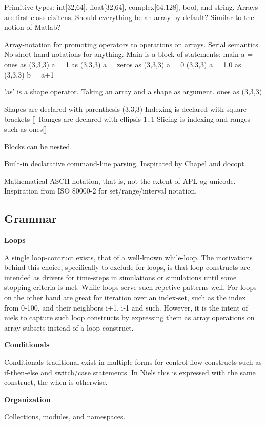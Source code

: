 \documentclass{sigplanconf}
\begin{document}
Primitive types: int[32,64], float[32,64], complex[64,128], bool, and string.
Arrays are first-class cizitens. Should everything be an array by default? Similar to the notion of Matlab?

Array-notation for promoting operators to operations on arrays.
Serial semantics.
No short-hand notations for anything.
Main is a block of statements:
main {
    a = ones as (3,3,3)
    a = 1 as (3,3,3)
    a = zeros as (3,3,3)
    a = 0 (3,3,3)
    a = 1.0 as (3,3,3)
    b = a+1
}

'as' is a shape operator. Taking an array and a shape as argument.
ones as (3,3,3)

Shapes are declared with parenthesis (3,3,3)
Indexing is declared with square brackets []
Ranges are declared with ellipsis 1..1
Slicing is indexing and ranges such as ones[]

Blocks can be nested.

Built-in declarative command-line parsing. Inspirated by Chapel and docopt.

Mathematical ASCII notation, that is, not the extent of APL og unicode.
Inspiration from ISO 80000-2 for set/range/interval notation.

\subsection{Grammar}

\textbf{Loops}

A single loop-contruct exists, that of a well-known while-loop. The motivations behind this choice, specifically to exclude for-loops, is that loop-constructs are intended as drivers for time-steps in simulations or simulations until some stopping criteria is met. While-loops serve such repetive patterns well. For-loops on the other hand are great for iteration over an index-set, such as the index from 0-100, and their neighbors i+1, i-1 and such.
However, it is the intent of niels to capture such loop constructs by expressing them as array operations on array-subsets instead of a loop construct.

\textbf{Conditionals}

Conditionals traditional exist in multiple forms for control-flow constructs such as if-then-else and switch/case statements. In Niels this is expressed with the same construct, the when-is-otherwise.

\textbf{Organization}

Collections, modules, and namespaces.
\end{document}
